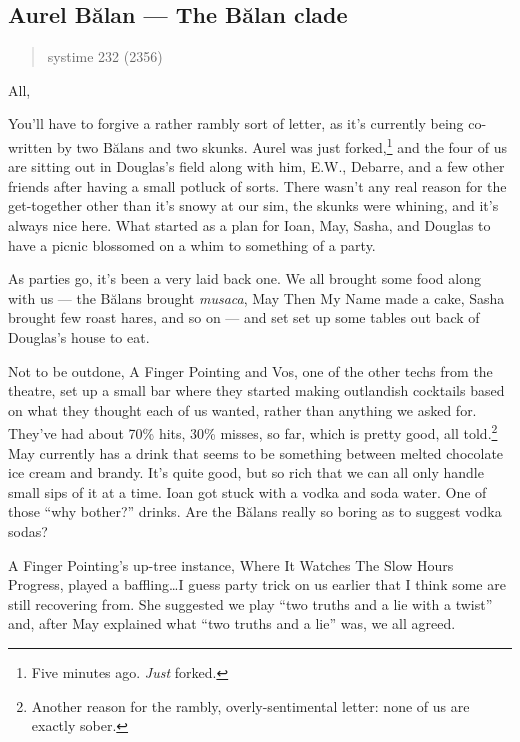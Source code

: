 \hypertarget{aurel-bux103lan-the-bux103lan-clade}{%
\subsection{Aurel Bălan — The Bălan clade}\label{aurel-bux103lan-the-bux103lan-clade}}

\begin{quote}
systime 232 (2356)
\end{quote}

All,

You'll have to forgive a rather rambly sort of letter, as it's currently being co-written by two Bălans and two skunks. Aurel was just forked,\footnote{Five minutes ago. \emph{Just} forked.} and the four of us are sitting out in Douglas's field along with him, E.W., Debarre, and a few other friends after having a small potluck of sorts. There wasn't any real reason for the get-together other than it's snowy at our sim, the skunks were whining, and it's always nice here. What started as a plan for Ioan, May, Sasha, and Douglas to have a picnic blossomed on a whim to something of a party.

As parties go, it's been a very laid back one. We all brought some food along with us — the Bălans brought \emph{musaca}, May Then My Name made a cake, Sasha brought few roast hares, and so on — and set set up some tables out back of Douglas's house to eat.

Not to be outdone, A Finger Pointing and Vos, one of the other techs from the theatre, set up a small bar where they started making outlandish cocktails based on what they thought each of us wanted, rather than anything we asked for. They've had about 70\% hits, 30\% misses, so far, which is pretty good, all told.\footnote{Another reason for the rambly, overly-sentimental letter: none of us are exactly sober.} May currently has a drink that seems to be something between melted chocolate ice cream and brandy. It's quite good, but so rich that we can all only handle small sips of it at a time. Ioan got stuck with a vodka and soda water. One of those ``why bother?'' drinks. Are the Bălans really so boring as to suggest vodka sodas?

A Finger Pointing's up-tree instance, Where It Watches The Slow Hours Progress, played a baffling\ldots{}I guess party trick on us earlier that I think some are still recovering from. She suggested we play ``two truths and a lie with a twist'' and, after May explained what ``two truths and a lie'' was, we all agreed.

